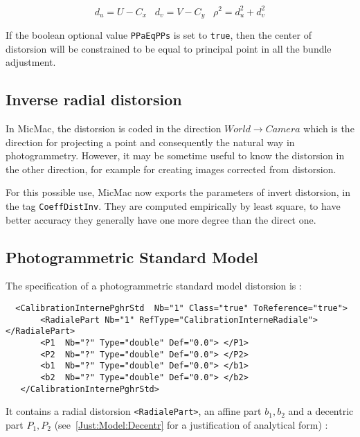 \begin{equation}
    d_u =  U-C_x \;\;\; d_v=V-C_y \;\;\;
    \rho^2 = d_u ^2 + d_v ^2
\end{equation}

If the boolean optional value {\tt PPaEqPPs} is set to  {\tt true}, then the center
of distorsion will be constrained to be equal to principal point in all the bundle
adjustment.


\subsection{Inverse radial distorsion}

In MicMac, the distorsion is coded in the direction $World \rightarrow Camera$ which
is the direction for projecting a point and consequently the natural way in photogrammetry.
However, it may be sometime useful to know the distorsion in the other direction,
for example for creating images corrected from distorsion.

For this possible use, MicMac now exports the parameters of invert distorsion,
in the tag {\tt CoeffDistInv}. They are computed empirically by least square,
to have better accuracy they generally have one more degree than the direct one.



\subsection{Photogrammetric Standard Model}

\label{SpGeo:Fraser}

The specification of a photogrammetric standard model distorsion is  :


\begin{verbatim}
  <CalibrationInternePghrStd  Nb="1" Class="true" ToReference="true">
       <RadialePart Nb="1" RefType="CalibrationInterneRadiale">    </RadialePart>
       <P1  Nb="?" Type="double" Def="0.0"> </P1>
       <P2  Nb="?" Type="double" Def="0.0"> </P2>
       <b1  Nb="?" Type="double" Def="0.0"> </b1>
       <b2  Nb="?" Type="double" Def="0.0"> </b2>
   </CalibrationInternePghrStd>
\end{verbatim}

It contains a radial distorsion {\tt <RadialePart>}, an affine part $b_1, b_2$ and
a decentric part $P_1,P_2$ (see~\ref{Just:Model:Decentr} for a justification of
analytical form) :

